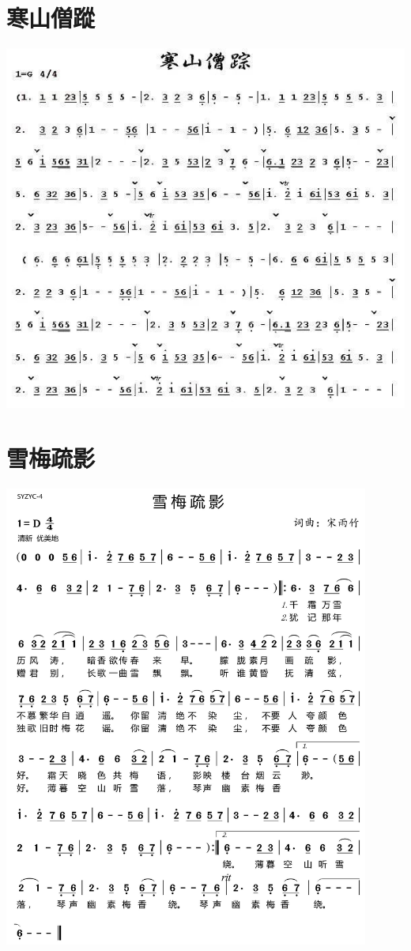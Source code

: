 \documentclass[cn,pad,chinesefont=nofont,twocol]{elegantbook}
\begin{document}
\section{寒山僧蹤}
	\includegraphics[width=\textwidth]{dongxiao/20200724-寒山僧踪2}  
\section{雪梅疏影}
    \includegraphics[width=0.9\textwidth]{dongxiao/20200725-雪梅疏影}
\end{document}
